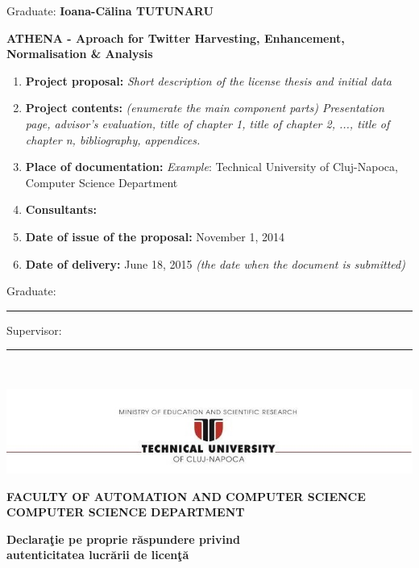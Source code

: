 \documentclass[12pt,a4paper,twoside]{report}
\renewcommand{\thesisauthor}{Ioana-C\u{a}lina TUTUNARU}    %
\renewcommand{\thesistitle}{ATHENA - Aproach for Twitter Harvesting, Enhancement, Normalisation \& Analysis}
\newcommand{\department}{\bf FACULTY OF AUTOMATION AND COMPUTER SCIENCE\\
COMPUTER SCIENCE DEPARTMENT}
\newcommand{\utcnlogo}{\includegraphics[width=15cm]{img/tucn.jpg}}
\newcommand{\uline}[1]{\rule[0pt]{#1}{0.4pt}}
\begin{document}
\vspace{1cm}

\begin{center}
Graduate: {\bf \thesisauthor}

\vspace{1cm}

{\bf \thesistitle}
\end{center}

\vspace{1cm}

\begin{enumerate}
 \item {\bf Project proposal:} {\it Short description of the license thesis and initial data}
\item {\bf Project contents:} {\it (enumerate the main component parts) Presentation page, advisor's evaluation, title of chapter 1, title of chapter 2, ..., title of chapter n, bibliography, appendices.}
\item {\bf Place of documentation:} {\it Example}: Technical University of Cluj-Napoca, Computer Science Department
\item {\bf Consultants:}
\item {\bf Date of issue of the proposal:} November 1, 2014
\item {\bf Date of  delivery:} June 18, 2015 {\it (the date when the document is submitted)}
  \end{enumerate}
\vspace{1.2cm}

\hspace{6cm} Graduate: \uline{6cm} 

\vspace{0.5cm}
\hspace{6cm} Supervisor: \uline{6cm} 

\thispagestyle{empty}


\newpage
$ $


\thispagestyle{empty}
\newpage

\begin{center}
\utcnlogo

\department
\end{center}

\begin{center}
{\bf
Declara\c{t}ie pe proprie r\u{a}spundere privind\\ 
autenticitatea lucr\u{a}rii de licen\c{t}\u{a}}
\end{center}
\vspace{0.5cm}
\end{document}
